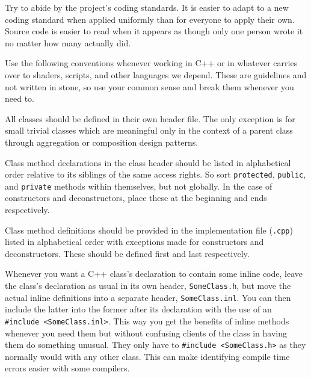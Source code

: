 

Try to abide by the project's coding standards. It is easier to adapt to a new coding standard when applied uniformly than for everyone to apply their own. Source code is easier to read when it appears as though only one person wrote it no matter how many actually did.

Use the following conventions whenever working in C++ or in whatever carries over to shaders, scripts, and other languages we depend. These are guidelines and not written in stone, so use your common sense and break them whenever you need to.


\startitemize[4]
\item
All classes should be defined in their own header file. The only exception is for small trivial classes which are meaningful only in the context of a parent class through aggregation or composition design patterns.

\item
Class method declarations in the class header should be listed in alphabetical order relative to its siblings of the same access rights. So sort {\tt protected}, {\tt public}, and {\tt private} methods within themselves, but not globally. In the case of constructors and deconstructors, place these at the beginning and ends respectively.

\item
Class method definitions should be provided in the implementation file ({\tt *.cpp}) listed in alphabetical order with exceptions made for constructors and deconstructors. These should be defined first and last respectively.

\item
Whenever you want a C++ class's declaration to contain some inline code, leave the class's declaration as usual in its own header, {\tt SomeClass.h}, but move the actual inline definitions into a separate header, {\tt SomeClass.inl}. You can then include the latter into the former after its declaration with the use of an {\tt \#include <SomeClass.inl>}. This way you get the benefits of inline methods whenever you need them but without confusing clients of the class in having them do something unusual. They only have to {\tt \#include <SomeClass.h>} as they normally would with any other class. This can make identifying compile time errors easier with some compilers.
\stopitemize

